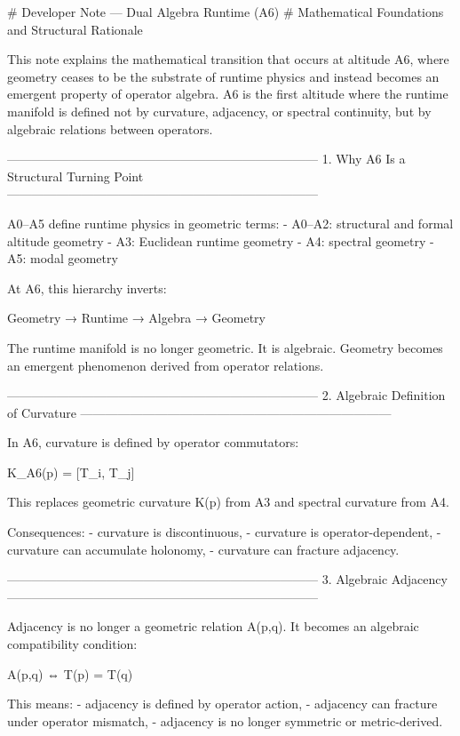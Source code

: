 # Developer Note — Dual Algebra Runtime (A6)
# Mathematical Foundations and Structural Rationale

This note explains the mathematical transition that occurs at altitude A6,
where geometry ceases to be the substrate of runtime physics and instead becomes
an emergent property of operator algebra. A6 is the first altitude where the
runtime manifold is defined not by curvature, adjacency, or spectral continuity,
but by algebraic relations between operators.

---------------------------------------------------------------------------
1. Why A6 Is a Structural Turning Point
---------------------------------------------------------------------------

A0–A5 define runtime physics in geometric terms:
- A0–A2: structural and formal altitude geometry
- A3: Euclidean runtime geometry
- A4: spectral geometry
- A5: modal geometry

At A6, this hierarchy inverts:

    Geometry → Runtime → Algebra → Geometry

The runtime manifold is no longer geometric. It is algebraic. Geometry becomes
an emergent phenomenon derived from operator relations.

---------------------------------------------------------------------------
2. Algebraic Definition of Curvature
---------------------------------------------------------------------------

In A6, curvature is defined by operator commutators:

    K_A6(p) = [T_i, T_j]

This replaces geometric curvature K(p) from A3 and spectral curvature from A4.

Consequences:
- curvature is discontinuous,
- curvature is operator-dependent,
- curvature can accumulate holonomy,
- curvature can fracture adjacency.

---------------------------------------------------------------------------
3. Algebraic Adjacency
---------------------------------------------------------------------------

Adjacency is no longer a geometric relation A(p,q). It becomes an algebraic
compatibility condition:

    A(p,q) ⇔ T(p) = T(q)

This means:
- adjacency is defined by operator action,
- adjacency can fracture under operator mismatch,
- adjacency is no longer symmetric or metric-derived.

